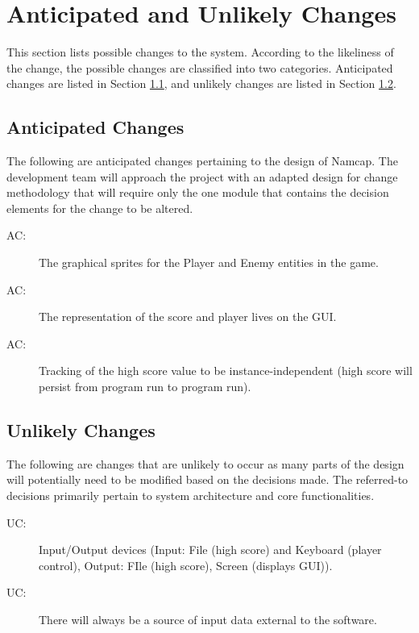 \documentclass[12pt, titlepage]{article}
\newcounter{acnum}
\newcommand{\actheacnum}{AC\theacnum}
\newcounter{ucnum}
\newcommand{\uctheucnum}{UC\theucnum}
\begin{document}
\section{Anticipated and Unlikely Changes} \label{SecChange}

This section lists possible changes to the system. According to the likeliness
of the change, the possible changes are classified into two
categories. Anticipated changes are listed in Section \ref{SecAchange}, and
unlikely changes are listed in Section \ref{SecUchange}.

\subsection{Anticipated Changes} \label{SecAchange}

The following are anticipated changes pertaining to the design of Namcap. The development team will approach the project with an adapted design for change methodology that will require only the one module that contains the decision elements for the change to be altered.

\begin{description}
\item[ \actheacnum \label{acSprites}:] The graphical sprites for the Player and Enemy entities in the game.
\item[ \actheacnum \label{acStats}:] The representation of the score and player lives on the GUI.
\item[ \actheacnum \label{acHScore}:] Tracking of the high score value to be instance-independent (high score will persist from program run to program run).
\end{description}

\subsection{Unlikely Changes} \label{SecUchange}

The following are changes that are unlikely to occur as many parts of the design will potentially need to be modified based on the decisions made. The referred-to decisions primarily pertain to system architecture and core functionalities.

\begin{description}
\item[ \uctheucnum \label{ucIO}:] Input/Output devices (Input: File (high score) and Keyboard (player control), Output: FIle (high score), Screen (displays GUI)).
\item[ \uctheucnum \label{ucInput}:] There will always be a source of input data external to the software.
\end{description}
\end{document}
